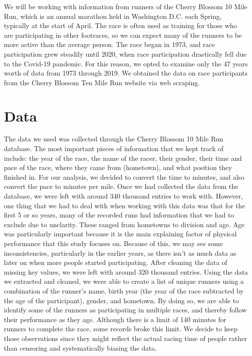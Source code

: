 \documentclass[12pt]{article}
\begin{document}
We will be working with information from runners of the Cherry Blossom 10
Mile Run, which is an annual marathon held in Washington D.C. each Spring,
typically at the start of April.
The race is often used as training for those who are participating in other
footraces, so we can expect many of the runners to be more active than the
average person.
The race began in 1973, and race participation grew steadily until 2020,
when race participation drastically fell  due to the Covid-19 pandemic.
For this reason, we opted to examine only the 47 years worth of data from
1973 through 2019.
We obtained the data on race participants from the Cherry Blossom Ten Mile Run
website via web scraping.

\section*{Data}

The data we used was collected through the Cherry Blossom 10 Mile Run database.
The most important pieces of information that we kept track of include:
the year of the race, the name of the racer, their gender, their time and
pace of the race, where they came from (hometown), and what position they
finished in.
For our analysis, we decided to convert the time to minutes, and also
convert the pace to minutes per mile.
Once we had collected the data from the database, we were left with around
340 thousand entries to work with.
However, one thing that we had to deal with when working with this data was
that for the first 5 or so years, many of the recorded runs had information
that we had to exclude due to unclarity.
These ranged from hometowns to division and age.
Age was particularly important because it is the main explaining factor of
physical performance that this study focuses on.
Because of this, we may see some inconsistencies, particularly in the earlier
years, as there isn't as much data as later on when more people
started participating.
After cleaning the data of missing key values, we were left with around
320 thousand entries.
Using the data we extracted and cleaned, we were able to create a list of
unique runners using a combination of the runner's name, birth year
(the year of the race subtracted by the age of the participant),
gender, and hometown.
By doing so, we are able to identify some of the runners as participating
in multiple races, and thereby follow their performance as they age.
Although there is a limit of 140 minutes for runners to complete the race,
some records broke this limit. We decide to keep those observations since they
might reflect the actual racing time of people rather than censoring and
systematically biasing the data.
\end{document}
